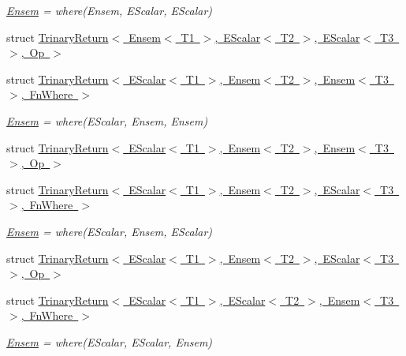 \begin{DoxyCompactItemize}
\begin{DoxyCompactList}\small\item\em \mbox{\hyperlink{classENSEM_1_1Ensem}{Ensem}} = where(\+Ensem, E\+Scalar, E\+Scalar) \end{DoxyCompactList}\item 
struct \mbox{\hyperlink{structENSEM_1_1TrinaryReturn_3_01Ensem_3_01T1_01_4_00_01EScalar_3_01T2_01_4_00_01EScalar_3_01T3_01_4_00_01Op_01_4}{Trinary\+Return$<$ Ensem$<$ T1 $>$, E\+Scalar$<$ T2 $>$, E\+Scalar$<$ T3 $>$, Op $>$}}
\item 
struct \mbox{\hyperlink{structENSEM_1_1TrinaryReturn_3_01EScalar_3_01T1_01_4_00_01Ensem_3_01T2_01_4_00_01Ensem_3_01T3_01_4_00_01FnWhere_01_4}{Trinary\+Return$<$ E\+Scalar$<$ T1 $>$, Ensem$<$ T2 $>$, Ensem$<$ T3 $>$, Fn\+Where $>$}}
\begin{DoxyCompactList}\small\item\em \mbox{\hyperlink{classENSEM_1_1Ensem}{Ensem}} = where(\+E\+Scalar, Ensem, Ensem) \end{DoxyCompactList}\item 
struct \mbox{\hyperlink{structENSEM_1_1TrinaryReturn_3_01EScalar_3_01T1_01_4_00_01Ensem_3_01T2_01_4_00_01Ensem_3_01T3_01_4_00_01Op_01_4}{Trinary\+Return$<$ E\+Scalar$<$ T1 $>$, Ensem$<$ T2 $>$, Ensem$<$ T3 $>$, Op $>$}}
\item 
struct \mbox{\hyperlink{structENSEM_1_1TrinaryReturn_3_01EScalar_3_01T1_01_4_00_01Ensem_3_01T2_01_4_00_01EScalar_3_01T3_01_4_00_01FnWhere_01_4}{Trinary\+Return$<$ E\+Scalar$<$ T1 $>$, Ensem$<$ T2 $>$, E\+Scalar$<$ T3 $>$, Fn\+Where $>$}}
\begin{DoxyCompactList}\small\item\em \mbox{\hyperlink{classENSEM_1_1Ensem}{Ensem}} = where(\+E\+Scalar, Ensem, E\+Scalar) \end{DoxyCompactList}\item 
struct \mbox{\hyperlink{structENSEM_1_1TrinaryReturn_3_01EScalar_3_01T1_01_4_00_01Ensem_3_01T2_01_4_00_01EScalar_3_01T3_01_4_00_01Op_01_4}{Trinary\+Return$<$ E\+Scalar$<$ T1 $>$, Ensem$<$ T2 $>$, E\+Scalar$<$ T3 $>$, Op $>$}}
\item 
struct \mbox{\hyperlink{structENSEM_1_1TrinaryReturn_3_01EScalar_3_01T1_01_4_00_01EScalar_3_01T2_01_4_00_01Ensem_3_01T3_01_4_00_01FnWhere_01_4}{Trinary\+Return$<$ E\+Scalar$<$ T1 $>$, E\+Scalar$<$ T2 $>$, Ensem$<$ T3 $>$, Fn\+Where $>$}}
\begin{DoxyCompactList}\small\item\em \mbox{\hyperlink{classENSEM_1_1Ensem}{Ensem}} = where(\+E\+Scalar, E\+Scalar, Ensem) \end{DoxyCompactList}\item 

\end{DoxyCompactItemize}
